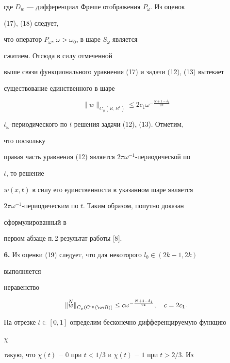 где $D_w$ --- дифференциал Фреше отображения $P_\omega$. Из оценок 


(17), (18) следует, 


что оператор $P_\omega$, $\omega>\omega_0$, в шаре $S_\omega$ является 


сжатием. Отсюда в силу отмеченной 


выше связи функционального уравнения (17) и задачи (12), (13) вытекает 


существование единственного в шаре 


\begin{equation} 


\|w\|_{C_\mu(R,B^1)}\le 2c_1 


\omega^{-\frac{N+1-\delta_1}{2k}} 


\end{equation} 


$t_\omega$-периодического по $t$ решения задачи (12), (13). Отметим, 


что поскольку 


правая часть уравнения (12) является $2\pi\omega^{-1}$-периодической по 


$t$, то решение 


$w(x,t)$ в силу его единственности в указанном шаре является 


$2\pi\omega^{-1}$-периодическим по $t$. Таким образом, попутно доказан 


сформулированный в 


первом абзаце п.\,2 результат работы [8]. 


\medskip 


 


{\bf 6.} Из оценки (19) следует, что для некоторого $l_0\in(2k-1,2k)$ 


выполняется  


неравенство 


\begin{equation} 


\|\up{N}{w}\|_{C_\mu(C^{l_0}(\ov\Omega))}\le c 


\omega^{-\frac{N+1-\delta_1}{2k}},\quad c=2c_1. 


\end{equation} 


На отрезке $t\in[0,1]$ определим бесконечно дифференцируемую функцию 


$\chi$ 


такую, что $\chi(t)=0$ при $t<1/3$ и $\chi(t)=1$ при $t>2/3$. Из 


